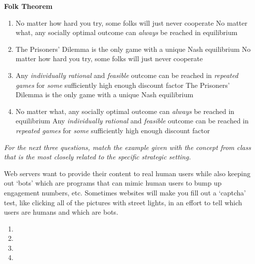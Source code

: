 \documentclass{article}
\begin{document}
\begin{question}[type=exam]{4}
  \textbf{Folk Theorem}
  \begin{enumerate}[label=\alph*), noitemsep]
    \item \vary
    {No matter how hard you try, some folks will just never cooperate}
    {No matter what, any socially optimal outcome can \textit{always} be reached in equilibrium}
    \item \vary
    {The Prisoners' Dilemma is the only game with a unique Nash equilibrium}
    {No matter how hard you try, some folks will just never cooperate}
    \item \vary
    {Any \textit{individually rational} and \textit{feasible} outcome can be reached in \textit{repeated games} for \textit{some} sufficiently high enough discount factor} %
    {The Prisoners' Dilemma is the only game with a unique Nash equilibrium}
    \item \vary
    {No matter what, any socially optimal outcome can \textit{always} be reached in equilibrium}
    {Any \textit{individually rational} and \textit{feasible} outcome can be reached in \textit{repeated games} for \textit{some} sufficiently high enough discount factor} %
  \end{enumerate}
\end{question}

\textit{For the next three questions, 
match the example given with the concept from class that is the most closely related to the specific strategic setting.}

\begin{question}[type=exam]{4}
  Web servers want to provide their content to real human users 
  while also keeping out `bots' which are programs that can mimic human users to bump up engagement numbers, etc. 
  Sometimes websites will make you fill out a `captcha' test,
  like clicking all of the pictures with street lights,
  in an effort to tell which users are humans and which are bots.
  \begin{enumerate}[label=\alph*), noitemsep]
    \item {}
    \item {}
    \item {}
    \item {}
  \end{enumerate}
\end{question}
\end{document}
